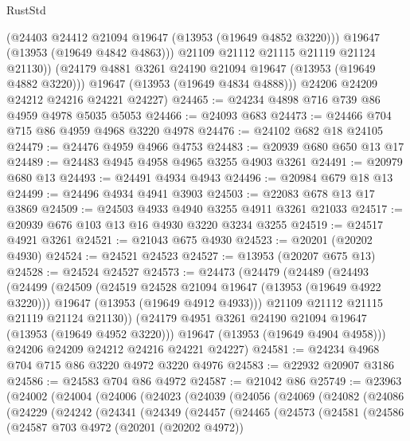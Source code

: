 \begin{lexlean}{RustStd}
\begin{coremodule}
              (@24403 @24412 @21094 @19647 (@13953 (@19649 @4852 @3220)))
              @19647
              (@13953 (@19649 @4842 @4863)))
            @21109
            @21112
            @21115
            @21119
            @21124
            @21130))
        (@24179 @4881 @3261 @24190 @21094 @19647 (@13953 (@19649 @4882 @3220)))
        @19647
        (@13953 (@19649 @4834 @4888)))
      @24206
      @24209
      @24212
      @24216
      @24221
      @24227)
@24465 := @24234 @4898 @716 @739 @86 @4959 @4978 @5035 @5053
@24466 := @24093 @683
@24473 := @24466 @704 @715 @86 @4959 @4968 @3220 @4978
@24476 := @24102 @682 @18 @24105
@24479 := @24476 @4959 @4966 @4753
@24483 := @20939 @680 @650 @13 @17
@24489 := @24483 @4945 @4958 @4965 @3255 @4903 @3261
@24491 := @20979 @680 @13
@24493 := @24491 @4934 @4943
@24496 := @20984 @679 @18 @13
@24499 := @24496 @4934 @4941 @3903
@24503 := @22083 @678 @13 @17 @3869
@24509 := @24503 @4933 @4940 @3255 @4911 @3261 @21033
@24517 := @20939 @676 @103 @13 @16 @4930 @3220 @3234 @3255
@24519 := @24517 @4921 @3261
@24521 := @21043 @675 @4930
@24523 := @20201 (@20202 @4930)
@24524 := @24521 @24523
@24527 := @13953 (@20207 @675 @13)
@24528 := @24524 @24527
@24573 := @24473
    (@24479
      (@24489
        (@24493
          (@24499
            (@24509
              (@24519 @24528 @21094 @19647 (@13953 (@19649 @4922 @3220)))
              @19647
              (@13953 (@19649 @4912 @4933)))
            @21109
            @21112
            @21115
            @21119
            @21124
            @21130))
        (@24179 @4951 @3261 @24190 @21094 @19647 (@13953 (@19649 @4952 @3220)))
        @19647
        (@13953 (@19649 @4904 @4958)))
      @24206
      @24209
      @24212
      @24216
      @24221
      @24227)
@24581 := @24234 @4968 @704 @715 @86 @3220 @4972 @3220 @4976
@24583 := @22932 @20907 @3186
@24586 := @24583 @704 @86 @4972
@24587 := @21042 @86
@25749 := @23963
    (@24002
      (@24004
        (@24006
          (@24023
            (@24039
              (@24056
                (@24069
                  (@24082
                    (@24086
                      (@24229
                        (@24242
                          (@24341
                            (@24349
                              (@24457
                                (@24465
                                  (@24573
                                    (@24581
                                      (@24586
                                        (@24587
                                          @703
                                          @4972
                                          (@20201 (@20202 @4972))

\end{coremodule}
\end{lexlean}
